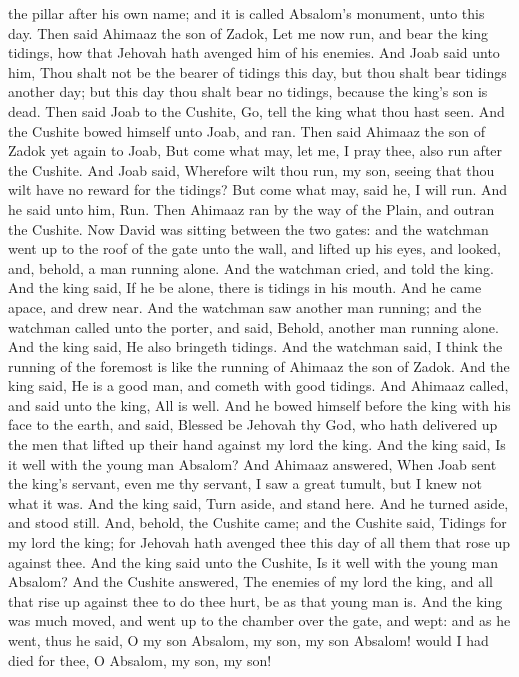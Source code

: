the pillar after his own name; and it is called Absalom’s monument, unto this day.  Then said Ahimaaz the son of Zadok, Let me now run, and bear the king tidings, how that Jehovah hath avenged him of his enemies. And Joab said unto him, Thou shalt not be the bearer of tidings this day, but thou shalt bear tidings another day; but this day thou shalt bear no tidings, because the king’s son is dead. Then said Joab to the Cushite, Go, tell the king what thou hast seen. And the Cushite bowed himself unto Joab, and ran. Then said Ahimaaz the son of Zadok yet again to Joab, But come what may, let me, I pray thee, also run after the Cushite. And Joab said, Wherefore wilt thou run, my son, seeing that thou wilt have no reward for the tidings? But come what may, said he, I will run. And he said unto him, Run. Then Ahimaaz ran by the way of the Plain, and outran the Cushite.  Now David was sitting between the two gates: and the watchman went up to the roof of the gate unto the wall, and lifted up his eyes, and looked, and, behold, a man running alone. And the watchman cried, and told the king. And the king said, If he be alone, there is tidings in his mouth. And he came apace, and drew near. And the watchman saw another man running; and the watchman called unto the porter, and said, Behold, another man running alone. And the king said, He also bringeth tidings. And the watchman said, I think the running of the foremost is like the running of Ahimaaz the son of Zadok. And the king said, He is a good man, and cometh with good tidings.  And Ahimaaz called, and said unto the king, All is well. And he bowed himself before the king with his face to the earth, and said, Blessed be Jehovah thy God, who hath delivered up the men that lifted up their hand against my lord the king. And the king said, Is it well with the young man Absalom? And Ahimaaz answered, When Joab sent the king’s servant, even me thy servant, I saw a great tumult, but I knew not what it was. And the king said, Turn aside, and stand here. And he turned aside, and stood still.  And, behold, the Cushite came; and the Cushite said, Tidings for my lord the king; for Jehovah hath avenged thee this day of all them that rose up against thee. And the king said unto the Cushite, Is it well with the young man Absalom? And the Cushite answered, The enemies of my lord the king, and all that rise up against thee to do thee hurt, be as that young man is. And the king was much moved, and went up to the chamber over the gate, and wept: and as he went, thus he said, O my son Absalom, my son, my son Absalom! would I had died for thee, O Absalom, my son, my son! 

